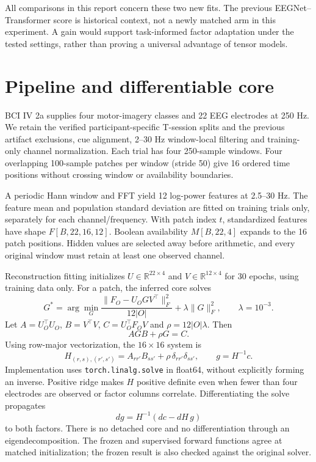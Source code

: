 \documentclass[11pt,a4paper]{article}
\newcommand{\code}[1]{{\small\nolinkurl{#1}}}
\begin{document}
All comparisons in this report concern these two new fits. The previous
EEGNet--Transformer score is historical context, not a newly matched arm in
this experiment. A gain would support task-informed factor adaptation under
the tested settings, rather than proving a universal advantage of tensor models.

\section{Pipeline and differentiable core}
BCI IV 2a supplies four motor-imagery classes and 22 EEG electrodes at 250 Hz.
We retain the verified participant-specific T-session splits and the previous
artifact exclusions, cue alignment, 2--30 Hz window-local filtering and
training-only channel normalization. Each trial has four 250-sample windows.
Four overlapping 100-sample patches per window (stride 50) give 16 ordered time
positions without crossing window or availability boundaries.

A periodic Hann window and FFT yield 12 log-power features at 2.5--30 Hz.
The feature mean and population standard deviation are fitted on training trials
only, separately for each channel/frequency. With patch index $t$, standardized
features have shape $F[B,22,16,12]$. Boolean availability $M[B,22,4]$ expands
to the 16 patch positions. Hidden values are selected away before arithmetic,
and every original window must retain at least one observed channel.

Reconstruction fitting initializes $U\in\mathbb R^{22\times4}$ and
$V\in\mathbb R^{12\times4}$ for 30 epochs, using training data only. For a patch,
the inferred core solves
\[
 G^*=\arg\min_G\frac{\|F_O-U_OGV^\top\|_F^2}{12|O|}
             +\lambda\|G\|_F^2,\qquad \lambda=10^{-3}.
\]
Let $A=U_O^\top U_O$, $B=V^\top V$, $C=U_O^\top F_OV$ and
$\rho=12|O|\lambda$. Then
\[
 AG B+\rho G=C.
\]
Using row-major vectorization, the $16\times16$ system is
\[
 H_{(r,s),(r',s')}=A_{rr'}B_{ss'}+
       \rho\,\delta_{rr'}\delta_{ss'},\qquad
 g=H^{-1}c.
\]
Implementation uses \code{torch.linalg.solve} in float64, without explicitly
forming an inverse. Positive ridge makes $H$ positive definite even when fewer
than four electrodes are observed or factor columns correlate. Differentiating
the solve propagates
\[
 dg=H^{-1}(dc-dH\,g)
\]
to both factors. There is no detached core and no differentiation through an
eigendecomposition. The frozen and supervised forward functions agree at matched
initialization; the frozen result is also checked against the original solver.
\end{document}
